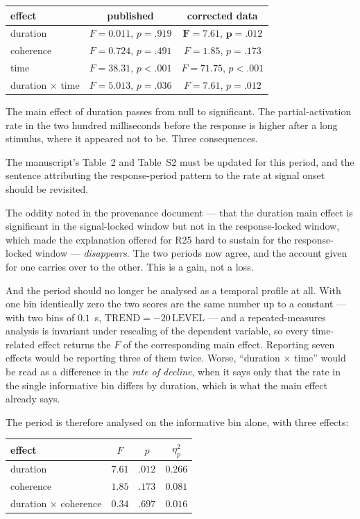 \documentclass[a4paper,11pt]{article}
\newcommand{\NN}[1]{\textcolor{newcol}{#1}}
\newcommand{\1}{\mathbbm{1}}
\begin{document}
\begin{center}
\begin{tabular}{lcc}
\toprule
effect & published & corrected data\\
\midrule
duration & $F=0.011$, $p=.919$ & $\mathbf{F=7.61}$, $\mathbf{p=.012}$\\
coherence & $F=0.724$, $p=.491$ & $F=1.85$, $p=.173$\\
time & $F=38.31$, $p<.001$ & $F=71.75$, $p<.001$\\
duration $\times$ time & $F=5.013$, $p=.036$ & $F=7.61$, $p=.012$\\
\bottomrule
\end{tabular}
\end{center}

\NN{The main effect of duration passes from null to significant.} The partial-activation
rate in the two hundred milliseconds before the response is higher after a long stimulus,
where it appeared not to be. Three consequences.

The manuscript's Table~2 and Table~S2 must be updated for this period, and the sentence
attributing the response-period pattern to the rate at signal onset should be revisited.

The oddity noted in the provenance document --- that the duration main effect is
significant in the signal-locked window but not in the response-locked window, which made the
explanation offered for R25 hard to sustain for the response-locked window --- \emph{disappears}. The two
periods now agree, and the account given for one carries over to the other. This is a
gain, not a loss.

\NN{And the period should no longer be analysed as a temporal profile at all.} With one
bin identically zero the two scores are the same number up to a constant --- with two
bins of $0.1$~s, $\mathrm{TREND}=-20\,\mathrm{LEVEL}$ --- and a repeated-measures
analysis is invariant under rescaling of the dependent variable, so every time-related
effect returns the $F$ of the corresponding main effect. Reporting seven effects would
be reporting three of them twice. Worse, ``duration $\times$ time'' would be read as a
difference in the \emph{rate of decline}, when it says only that the rate in the single
informative bin differs by duration, which is what the main effect already says.

The period is therefore analysed on the informative bin alone, with three effects:

\begin{center}
\begin{tabular}{lccc}
\toprule
effect & $F$ & $p$ & $\eta_p^2$\\
\midrule
duration & $7.61$ & $.012$ & $0.266$\\
coherence & $1.85$ & $.173$ & $0.081$\\
duration $\times$ coherence & $0.34$ & $.697$ & $0.016$\\
\bottomrule
\end{tabular}
\end{center}
\end{document}

